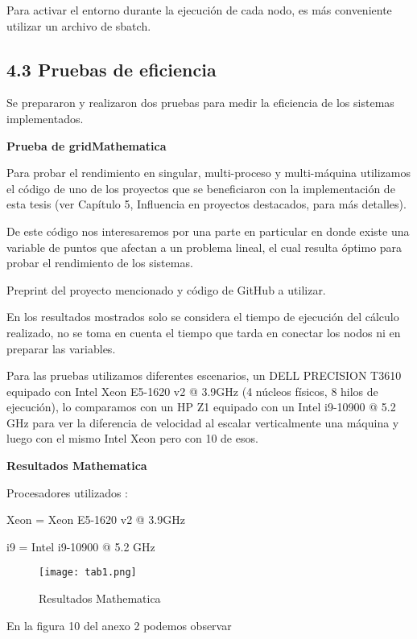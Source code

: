 \begin{spacing}{1.5}
  Para activar el entorno durante la ejecución de cada nodo, es más
  conveniente utilizar un archivo de sbatch.

  \subsection{4.3 Pruebas de eficiencia}  \label{chap:4.3}

  Se prepararon y realizaron dos pruebas para medir la eficiencia de los sistemas implementados.

      \textbf{Prueba de gridMathematica}

      Para probar el rendimiento en singular, multi-proceso y multi-máquina utilizamos el código de uno de los proyectos que se beneficiaron con la implementación de esta tesis (ver Capítulo 5, Influencia en proyectos destacados, para más detalles).

      De este código nos interesaremos por una parte en particular en donde existe una variable de puntos que afectan a un problema lineal, el cual resulta óptimo para probar el rendimiento de los sistemas.

      Preprint del proyecto mencionado y código de GitHub a utilizar. \cite{preprint} \cite{git}

      En los resultados mostrados solo se considera el tiempo de ejecución del cálculo realizado, no se toma en cuenta el tiempo que tarda en conectar los nodos ni en preparar las variables.

      Para las pruebas utilizamos diferentes escenarios, un DELL PRECISION T3610 equipado con Intel Xeon E5-1620 v2 @ 3.9GHz (4 núcleos físicos, 8 hilos de ejecución), lo comparamos con un HP Z1 equipado con un Intel i9-10900 @ 5.2 GHz para ver la diferencia de velocidad al escalar verticalmente una máquina y luego con el mismo Intel Xeon pero con 10 de esos.

      \textbf{Resultados Mathematica}

      Procesadores utilizados : 

      Xeon = Xeon E5-1620 v2 @ 3.9GHz 

      i9 = Intel i9-10900 @ 5.2 GHz

      \begin{figure}[h]
            \centering
            \texttt{[image: tab1.png]}
            \caption{Resultados Mathematica}
            \label{fig:etiqueta}
          \end{figure}

      En la figura 10 del anexo 2 podemos observar


\end{spacing}
